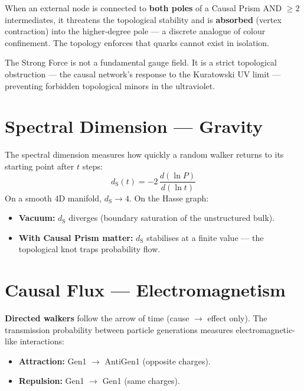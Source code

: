 \documentclass[11pt, a4paper, openany]{book}
\newcommand{\dS}{d_{\mathrm{S}}}
\begin{document}
When an external node is connected to \textbf{both poles} of a Causal Prism
AND $\ge 2$ intermediates, it threatens the topological stability and is
\textbf{absorbed} (vertex contraction) into the higher-degree pole --- a
discrete analogue of colour confinement.  The topology enforces that quarks
cannot exist in isolation.

\begin{result}
The Strong Force is not a fundamental gauge field.  It is a strict
topological obstruction --- the causal network's response to the Kuratowski UV
limit --- preventing forbidden topological minors in the ultraviolet.
\end{result}

\section{Spectral Dimension --- Gravity}

The spectral dimension measures how quickly a random walker returns to its
starting point after $t$ steps:
\[
  \dS(t) = -2\,\frac{d(\ln P)}{d(\ln t)}
\]
On a smooth 4D manifold, $\dS \to 4$.  On the Hasse graph:
\begin{itemize}
  \item \textbf{Vacuum:} $\dS$ diverges (boundary saturation of the
        unstructured bulk).
  \item \textbf{With Causal Prism matter:} $\dS$ stabilises at a finite value
        --- the topological knot traps probability flow.
\end{itemize}

\section{Causal Flux --- Electromagnetism}

\textbf{Directed walkers} follow the arrow of time (cause $\to$ effect only).
The transmission probability between particle generations measures
electromagnetic-like interactions:
\begin{itemize}
  \item \textbf{Attraction:} Gen1 $\to$ AntiGen1 (opposite charges).
  \item \textbf{Repulsion:} Gen1 $\to$ Gen1 (same charges).
\end{itemize}

\end{document}

